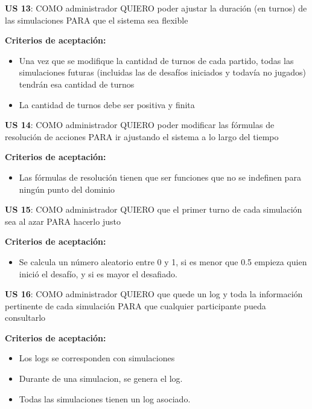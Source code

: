\begin{tcolorbox}
\textbf{US 13}: COMO administrador QUIERO poder ajustar la duración (en turnos) de las simulaciones PARA que el sistema sea flexible

\vline

\textbf{Criterios de aceptación:}
\begin{itemize}
\item Una vez que se modifique la cantidad de turnos de cada partido, todas las simulaciones futuras (incluidas las de desafíos iniciados y todavía no jugados) tendrán esa cantidad de turnos
\item La cantidad de turnos debe ser positiva y finita
\end{itemize}
\end{tcolorbox}
\vspace{10pt}

\begin{tcolorbox}
\textbf{US 14}: COMO administrador QUIERO poder modificar las fórmulas de resolución de acciones PARA ir ajustando el sistema a lo largo del tiempo

\vline

\textbf{Criterios de aceptación:}
\begin{itemize}
\item Las fórmulas de resolución tienen que ser funciones que no se indefinen para ningún punto del dominio
\end{itemize}
\end{tcolorbox}
\vspace{10pt}


\begin{tcolorbox}
\textbf{US 15}: COMO administrador QUIERO que el primer turno de cada simulación sea al azar PARA hacerlo justo

\vline

\textbf{Criterios de aceptación:}
\begin{itemize}
\item Se calcula un número aleatorio entre 0 y 1, si es menor que 0.5 empieza quien inició el desafío, y si es mayor el desafiado.
\end{itemize}
\end{tcolorbox}
\vspace{10pt}

\begin{tcolorbox}
\textbf{US 16}: COMO administrador QUIERO que quede un log y toda la información pertinente de cada simulación PARA que cualquier participante pueda consultarlo

\vline

\textbf{Criterios de aceptación:}
\begin{itemize}
\item Los logs se corresponden con simulaciones 
\item Durante de una simulacion, se genera el log.
\item Todas las simulaciones tienen un log asociado.
\end{itemize}
\end{tcolorbox}
\vspace{10pt}

